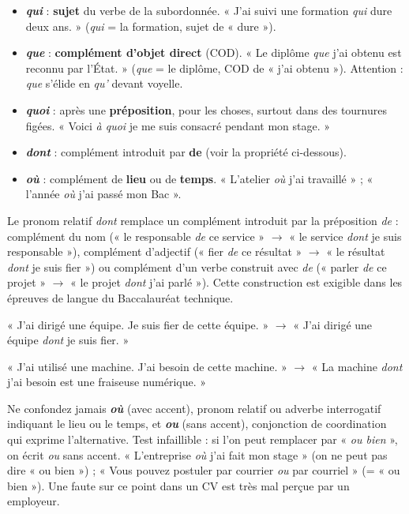 \documentclass[11pt]{article}
\newcommand{\cle}[1]{{\popxbold\color{popdark}#1}}
\begin{document}
\begin{itemize}
\item \emph{\textbf{qui}} : \textbf{sujet} du verbe de la subordonnée. « J'ai suivi une formation \emph{qui} dure deux ans. » (\emph{qui} = la formation, sujet de « dure »).
\item \emph{\textbf{que}} : \textbf{complément d'objet direct} (COD). « Le diplôme \emph{que} j'ai obtenu est reconnu par l'État. » (\emph{que} = le diplôme, COD de « j'ai obtenu »). Attention : \emph{que} s'élide en \emph{qu'} devant voyelle.
\item \emph{\textbf{quoi}} : après une \textbf{préposition}, pour les choses, surtout dans des tournures figées. « Voici \emph{à quoi} je me suis consacré pendant mon stage. »
\item \emph{\textbf{dont}} : complément introduit par \textbf{de} (voir la propriété ci-dessous).
\item \emph{\textbf{où}} : complément de \textbf{lieu} ou de \textbf{temps}. « L'atelier \emph{où} j'ai travaillé » ; « l'année \emph{où} j'ai passé mon Bac ».
\end{itemize}

\begin{propriete}
Le pronom relatif \emph{\cle{dont}} remplace un complément introduit par la préposition \emph{de} : complément du nom (« le responsable \emph{de} ce service » $\rightarrow$ « le service \emph{dont} je suis responsable »), complément d'adjectif (« fier \emph{de} ce résultat » $\rightarrow$ « le résultat \emph{dont} je suis fier ») ou complément d'un verbe construit avec \emph{de} (« parler \emph{de} ce projet » $\rightarrow$ « le projet \emph{dont} j'ai parlé »). Cette construction est exigible dans les épreuves de langue du Baccalauréat technique.
\end{propriete}

\begin{exemplebox}
« J'ai dirigé une équipe. Je suis fier de cette équipe. » $\rightarrow$ « J'ai dirigé une équipe \emph{dont} je suis fier. »

« J'ai utilisé une machine. J'ai besoin de cette machine. » $\rightarrow$ « La machine \emph{dont} j'ai besoin est une fraiseuse numérique. »
\end{exemplebox}

\begin{attention}
Ne confondez jamais \emph{\textbf{où}} (avec accent), pronom relatif ou adverbe interrogatif indiquant le lieu ou le temps, et \emph{\textbf{ou}} (sans accent), conjonction de coordination qui exprime l'alternative. Test infaillible : si l'on peut remplacer par « \emph{ou bien} », on écrit \emph{ou} sans accent. « L'entreprise \emph{où} j'ai fait mon stage » (on ne peut pas dire « ou bien ») ; « Vous pouvez postuler par courrier \emph{ou} par courriel » (= « ou bien »). Une faute sur ce point dans un CV est très mal perçue par un employeur.
\end{attention}
\end{document}
